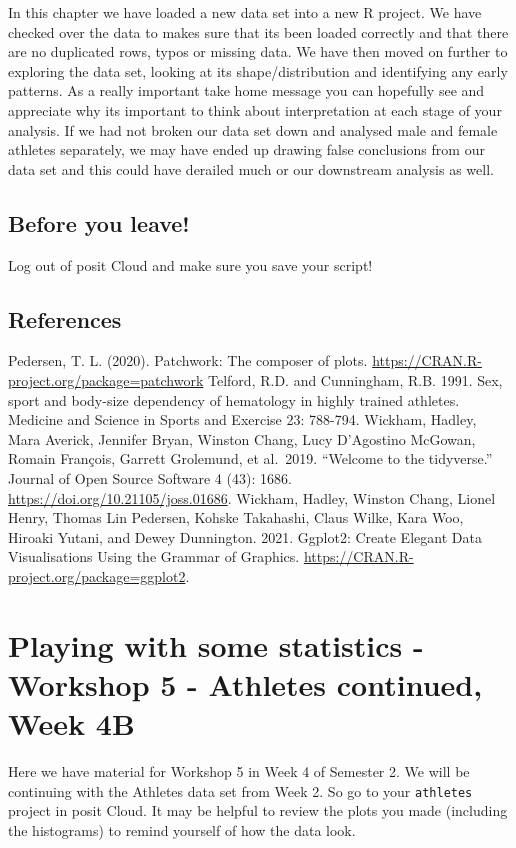 \documentclass[
]{book}
\begin{document}
In this chapter we have loaded a new data set into a new R project. We have checked over the data to makes sure that its been loaded correctly and that there are no duplicated rows, typos or missing data. We have then moved on further to exploring the data set, looking at its shape/distribution and identifying any early patterns. As a really important take home message you can hopefully see and appreciate why its important to think about interpretation at each stage of your analysis. If we had not broken our data set down and analysed male and female athletes separately, we may have ended up drawing false conclusions from our data set and this could have derailed much or our downstream analysis as well.

\hypertarget{before-you-leave-7}{%
\section{Before you leave!}\label{before-you-leave-7}}

Log out of posit Cloud and make sure you save your script!

\hypertarget{references-8}{%
\section{References}\label{references-8}}

Pedersen, T. L. (2020). Patchwork: The composer of plots. \url{https://CRAN.R-project.org/package=patchwork}
Telford, R.D. and Cunningham, R.B. 1991. Sex, sport and body-size dependency of hematology in highly trained athletes. Medicine and Science in Sports and Exercise 23: 788-794.
Wickham, Hadley, Mara Averick, Jennifer Bryan, Winston Chang, Lucy D'Agostino McGowan, Romain François, Garrett Grolemund, et al.~2019. ``Welcome to the tidyverse.'' Journal of Open Source Software 4 (43): 1686. \url{https://doi.org/10.21105/joss.01686}.
Wickham, Hadley, Winston Chang, Lionel Henry, Thomas Lin Pedersen, Kohske Takahashi, Claus Wilke, Kara Woo, Hiroaki Yutani, and Dewey Dunnington. 2021. Ggplot2: Create Elegant Data Visualisations Using the Grammar of Graphics. \url{https://CRAN.R-project.org/package=ggplot2}.

\hypertarget{stats}{%
\chapter{Playing with some statistics - Workshop 5 - Athletes continued, Week 4B}\label{stats}}

Here we have material for Workshop 5 in Week 4 of Semester 2. We will be continuing with the Athletes data set from Week 2. So go to your \texttt{athletes} project in posit Cloud. It may be helpful to review the plots you made (including the histograms) to remind yourself of how the data look.
\end{document}
